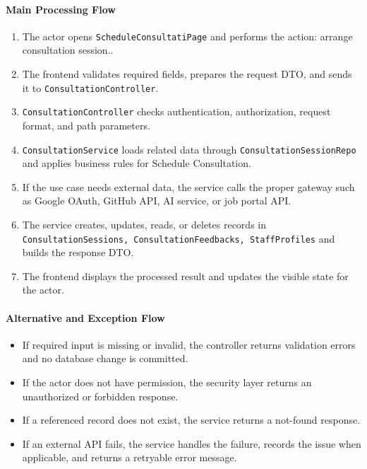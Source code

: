 \paragraph{Main Processing Flow}

\begin{enumerate}
    \item The actor opens \texttt{ScheduleConsultatiPage} and performs the action: arrange consultation session..
    \item The frontend validates required fields, prepares the request DTO, and sends it to \texttt{ConsultationController}.
    \item \texttt{ConsultationController} checks authentication, authorization, request format, and path parameters.
    \item \texttt{ConsultationService} loads related data through \texttt{ConsultationSessionRepo} and applies business rules for Schedule Consultation.
    \item If the use case needs external data, the service calls the proper gateway such as Google OAuth, GitHub API, AI service, or job portal API.
    \item The service creates, updates, reads, or deletes records in \texttt{ConsultationSessions, ConsultationFeedbacks, StaffProfiles} and builds the response DTO.
    \item The frontend displays the processed result and updates the visible state for the actor.
\end{enumerate}

\paragraph{Alternative and Exception Flow}

\begin{itemize}
    \item If required input is missing or invalid, the controller returns validation errors and no database change is committed.
    \item If the actor does not have permission, the security layer returns an unauthorized or forbidden response.
    \item If a referenced record does not exist, the service returns a not-found response.
    \item If an external API fails, the service handles the failure, records the issue when applicable, and returns a retryable error message.
\end{itemize}

